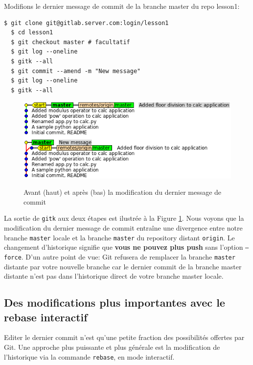 \documentclass{../../common/tufte-latex/tufte-handout}
\begin{document}
Modifions le dernier message de commit de la branche master du repo lesson1:

\begin{lstlisting}[style=BashInputStyle]
  $ git clone git@gitlab.server.com:login/lesson1
  $ cd lesson1
  $ git checkout master # facultatif
  $ git log --oneline
  $ gitk --all
  $ git commit --amend -m "New message"
  $ git log --oneline
  $ gitk --all
\end{lstlisting}

\begin{figure}%
  \centering
  \includegraphics[width=0.85\linewidth]{gitcommit-amend.png}
  \label{fig:gitcommit-amend}
  \caption{Avant (haut) et après (bas) la modification du dernier message de commit}
\end{figure}

La sortie de \texttt{gitk} aux deux étapes est ilustrée à la Figure \ref{fig:gitcommit-amend}.
Nous voyons que la modification du dernier message de commit entraîne une divergence entre notre branche \texttt{master} locale et la branche \texttt{master} du repository distant \texttt{origin}.
Le changement d'historique signifie que \textbf{vous ne pouvez plus push} sans l'option \texttt{--force}. 
D'un autre point de vue: Git refusera de remplacer la branche \texttt{master} distante par votre nouvelle branche car le dernier commit de la branche master distante n'est pas dans l'historique direct de votre branche master locale.

\subsection{Des modifications plus importantes avec le rebase interactif}

Editer le dernier commit n'est qu'une petite fraction des possibilités offertes par Git. Une approche plus puissante et plus générale est la modification de l'historique via la commande \texttt{rebase}, en mode interactif.
\end{document}
